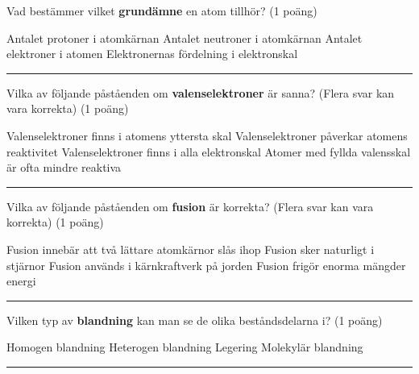\documentclass{exam}
\begin{document}
\begin{questions}
\break
\question Vad bestämmer vilket \textbf{grundämne} en atom tillhör? (1 poäng)
\vspace{2mm}
\begin{checkboxes}
    \choice Antalet protoner i atomkärnan
    \choice Antalet neutroner i atomkärnan
    \choice Antalet elektroner i atomen
    \choice Elektronernas fördelning i elektronskal
\end{checkboxes}

\vspace{5mm} 
\hrule 
\vspace{5mm} 

\question Vilka av följande påståenden om \textbf{valenselektroner} är sanna? (Flera svar kan vara korrekta) (1 poäng)
\vspace{2mm}
\begin{checkboxes}
    \choice Valenselektroner finns i atomens yttersta skal
    \choice Valenselektroner påverkar atomens reaktivitet
    \choice Valenselektroner finns i alla elektronskal
    \choice Atomer med fyllda valensskal är ofta mindre reaktiva
\end{checkboxes}

\vspace{5mm} 
\hrule 
\vspace{5mm} 

\question Vilka av följande påståenden om \textbf{fusion} är korrekta? (Flera svar kan vara korrekta) (1 poäng)
\vspace{2mm}
\begin{checkboxes}
    \choice Fusion innebär att två lättare atomkärnor slås ihop
    \choice Fusion sker naturligt i stjärnor
    \choice Fusion används i kärnkraftverk på jorden
    \choice Fusion frigör enorma mängder energi
\end{checkboxes}

\vspace{5mm} 
\hrule 
\vspace{5mm} 

\question Vilken typ av \textbf{blandning} kan man se de olika beståndsdelarna i? (1 poäng)
\vspace{2mm}
\begin{checkboxes}
    \choice Homogen blandning
    \choice Heterogen blandning
    \choice Legering
    \choice Molekylär blandning
\end{checkboxes}

\vspace{5mm} 
\hrule 
\vspace{5mm} 


\end{questions}
\end{document}
